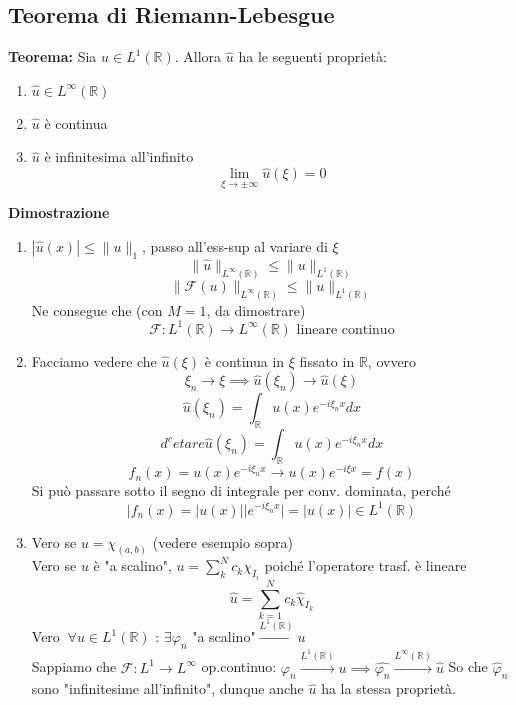 \documentclass[a4paper]{article}
\newcommand{\R}{\mathbb{R}}
\begin{document}
\subsection{Teorema di Riemann-Lebesgue}
\begin{tcolorbox}
\textbf{Teorema: }Sia $u\in L^{1}(\R)$. Allora $\hat{u}$ ha le seguenti proprietà:
\begin{enumerate}
	\item $\hat{u}\in L^{\infty}(\R)$
	\item $\hat{u}$ è continua
	\item $\hat{ u}$ è infinitesima all'infinito
		\[\lim_{\xi \to \pm \infty} \hat{u}(\xi)=0\]
\end{enumerate}

\end{tcolorbox}
\textbf{Dimostrazione} 
\begin{enumerate}
	\item $|\hat{u}(x)|\le \|u\|_1$, passo all'ess-sup al variare di $\xi$ 
		\[\|\hat{u}\|_{L^{\infty}(\R)}\le \|u\|_{L^{1}(\R)}\]
		\[\|\mathcal F(u)\|_{L^{\infty}(\R)}\le \|u\|_{L^{1}(\R)}\]
		Ne consegue che (con $M=1$, da dimostrare)
		\[\mathcal F:L^{1}(\R)\to L^{\infty}(\R)\text{ lineare continuo}\]
	\item Facciamo vedere che $\hat{ u}(\xi)$ è continua in $\xi$ fissato in $\R$, ovvero
		\[\xi_n\to \xi\implies \hat{u}(\xi_n)\to \hat{ u}(\xi)\]
		\[\hat{u}(\xi_n)= \int_{\R}^{} u(x) e^{-i\xi_n x}dx\] 
		\[d^{c}etare \hat{u}(\xi_n)= \int_{\R}^{} u(x) e^{-i\xi_n x}dx\] 
		\[f_n(x)=u(x)e^{-i\xi_n x}\to u(x)e ^{-i\xi x}=f(x)\]
		Si può passare sotto il segno di integrale per conv. dominata, perché
		\[|f_n(x)=|u(x)| |e^{-i\xi_n x}|=|u(x)|\in L^{1}(\R)\]
	\item Vero se $u=\chi_{(a,b)}$ (vedere esempio sopra)
		\\Vero se $u$ è "a scalino", $u=\sum_{k}^{N} c_k\chi_{I_i}$ poiché l'operatore trasf. è lineare
		\[\hat{ u}=\sum_{k=1}^{N} c_k \hat{\chi}_{I_k}\]
		Vero $\ \forall u\in L^{1}(\R)$ : $\exists \varphi_n$ "a scalino"$\xrightarrow{L^{1}(\R)} u$
		\\Sappiamo che $\mathcal F:L^1\to L^\infty$ op.continuo: $\varphi_n\xrightarrow{L^{1}(\R)}u\implies \hat{\varphi_n}\xrightarrow{L^{\infty}(\R)}\hat{u}$
So che $\hat{\varphi}_n$ sono "infinitesime all'infinito", dunque anche $\hat{u}$ ha la stessa proprietà.

\end{enumerate}
\end{document}
